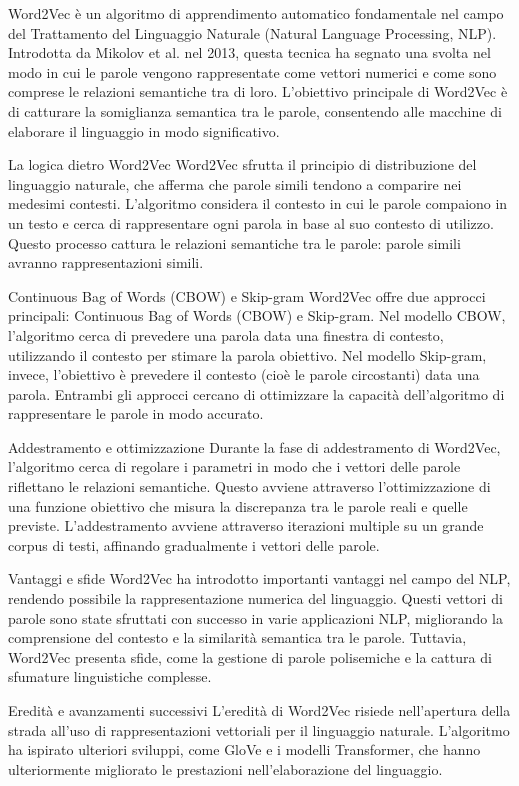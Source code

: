 Word2Vec è un algoritmo di apprendimento automatico fondamentale nel campo del Trattamento del Linguaggio Naturale (Natural Language Processing, NLP). Introdotta da Mikolov et al. nel 2013, questa tecnica ha segnato una svolta nel modo in cui le parole vengono rappresentate come vettori numerici e come sono comprese le relazioni semantiche tra di loro. L'obiettivo principale di Word2Vec è di catturare la somiglianza semantica tra le parole, consentendo alle macchine di elaborare il linguaggio in modo significativo.

La logica dietro Word2Vec
Word2Vec sfrutta il principio di distribuzione del linguaggio naturale, che afferma che parole simili tendono a comparire nei medesimi contesti. L'algoritmo considera il contesto in cui le parole compaiono in un testo e cerca di rappresentare ogni parola in base al suo contesto di utilizzo. Questo processo cattura le relazioni semantiche tra le parole: parole simili avranno rappresentazioni simili.

Continuous Bag of Words (CBOW) e Skip-gram
Word2Vec offre due approcci principali: Continuous Bag of Words (CBOW) e Skip-gram. Nel modello CBOW, l'algoritmo cerca di prevedere una parola data una finestra di contesto, utilizzando il contesto per stimare la parola obiettivo. Nel modello Skip-gram, invece, l'obiettivo è prevedere il contesto (cioè le parole circostanti) data una parola. Entrambi gli approcci cercano di ottimizzare la capacità dell'algoritmo di rappresentare le parole in modo accurato.

Addestramento e ottimizzazione
Durante la fase di addestramento di Word2Vec, l'algoritmo cerca di regolare i parametri in modo che i vettori delle parole riflettano le relazioni semantiche. Questo avviene attraverso l'ottimizzazione di una funzione obiettivo che misura la discrepanza tra le parole reali e quelle previste. L'addestramento avviene attraverso iterazioni multiple su un grande corpus di testi, affinando gradualmente i vettori delle parole.

Vantaggi e sfide
Word2Vec ha introdotto importanti vantaggi nel campo del NLP, rendendo possibile la rappresentazione numerica del linguaggio. Questi vettori di parole sono state sfruttati con successo in varie applicazioni NLP, migliorando la comprensione del contesto e la similarità semantica tra le parole. Tuttavia, Word2Vec presenta sfide, come la gestione di parole polisemiche e la cattura di sfumature linguistiche complesse.

Eredità e avanzamenti successivi
L'eredità di Word2Vec risiede nell'apertura della strada all'uso di rappresentazioni vettoriali per il linguaggio naturale. L'algoritmo ha ispirato ulteriori sviluppi, come GloVe e i modelli Transformer, che hanno ulteriormente migliorato le prestazioni nell'elaborazione del linguaggio.